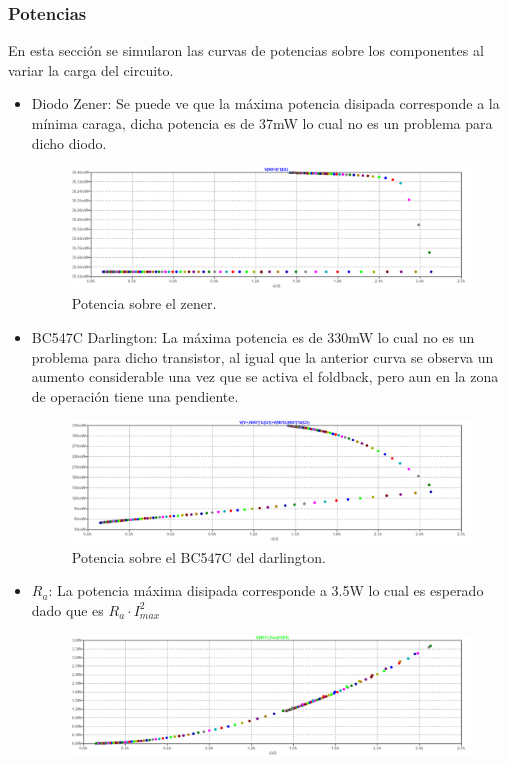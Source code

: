 \subsubsection{Potencias}
\label{sec:sim-pot}
En esta sección se simularon las curvas de potencias sobre los componentes al variar la carga del circuito.\\
\begin{itemize}
\item Diodo Zener: 
Se puede ve que la máxima potencia disipada corresponde a la mínima caraga, dicha potencia es de 37mW lo cual no es un problema para dicho diodo.
\begin{figure}[H]
\centering
	\includegraphics[width=1\textwidth]{ImagenesEjercicio2/potzener.png}
	\caption{Potencia sobre el zener.}
	\label{fig:potzener}
\end{figure}
\item BC547C Darlington: La máxima potencia es de 330mW lo cual no es un problema para dicho transistor, al igual que la anterior curva se observa un aumento considerable una vez que se activa el foldback, pero aun en la zona de operación tiene una pendiente.
\begin{figure}[H]
\centering
	\includegraphics[width=1\textwidth]{ImagenesEjercicio2/potbc547.png}
	\caption{Potencia sobre el BC547C del darlington.}
	\label{fig:potbc547}
\end{figure}
\item $R_a$: La potencia máxima disipada corresponde a 3.5W lo cual es esperado dado que es $R_a\cdot I_{max}^2$ 
\begin{figure}[H]
\centering
	\includegraphics[width=1\textwidth]{ImagenesEjercicio2/potra.png}

\end{figure}
\end{itemize}
